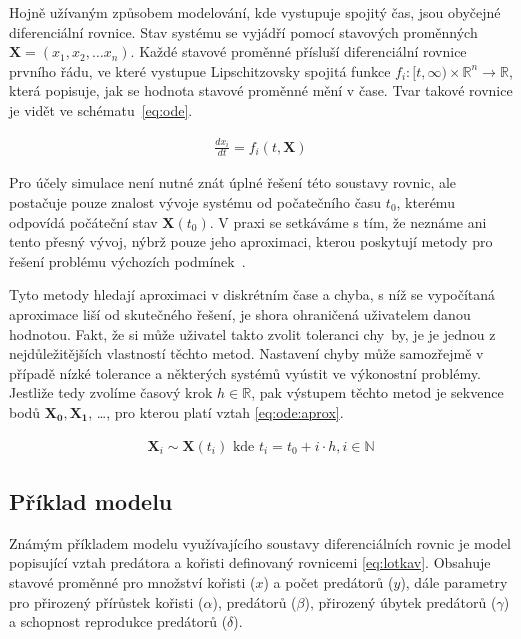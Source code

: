Hojně užívaným způsobem modelování, kde vystupuje spojitý čas, jsou obyčejné diferenciální rovnice.
Stav systému se vyjádří pomocí stavových pro\-měn\-ných $\mathbf{X} = (\mathit{x_1}, \mathit{x_2}, \dots \mathit{x_n})$.
Každé stavové proměnné přísluší diferenciální rovni\-ce prvního řádu, ve které vystupue
Lipschitzovsky spojitá \cite[str. 149 -- 163]{eriksson2004} funkce
$f_i: [t, \infty) \times \mathbb{R}^n \rightarrow \mathbb{R}$, která popisuje,
jak se hodnota stavové proměnné mění v čase. Tvar takové rovnice je vidět ve sché\-ma\-tu~\ref{eq:ode}.

\begin{align}\label{eq:ode}
\frac{d\mathit{x_i}}{dt} = f_i(t, \mathbf{X})
\end{align}

Pro účely simulace není nutné znát úplné řešení této soustavy rovnic, ale postačuje pouze znalost
vývoje systému od počatečního času $t_0$, kterému odpovídá počáteční stav $\mathbf{X}(t_0)$.
V praxi se setkáváme s tím, že neznáme ani tento přesný vývoj, nýbrž pouze jeho aproximaci,
kterou poskytují metody pro řešení problému výchozích podmínek~\cite{iserles1996}.

Tyto metody hledají aproximaci v diskrétním čase a chyba, s níž se vy\-po\-čí\-ta\-ná
aproximace liší od skutečného řešení, je shora ohraničená uživatelem danou hodnotou.
Fakt, že si může uživatel takto zvolit toleranci chy~by, je je jednou z nejdůležitějších
vlastností těchto metod. Nastavení chyby může samozřejmě v případě nízké tolerance
a některých systémů vyústit ve výkonostní problémy. Jestliže tedy zvolíme časový
krok $h \in \mathbb{R}$, pak výstupem těchto metod je sekvence bodů $\mathbf{X_0}, \mathbf{X_1}$, \ldots,
pro kterou platí vztah \ref{eq:ode:aprox}.

\begin{align}\label{eq:ode:aprox}
\mathbf{X}_i \sim \mathbf{X}(t_i) \textrm{ kde } t_i = t_0 + i \cdot h, i \in \mathbb{N}
\end{align}


\subsection{Příklad modelu}\label{section:lotkav}

Známým příkladem modelu využívajícího soustavy diferenciálních rovnic je model popisující vztah predátora
a kořisti \cite{lotka1925} definovaný rovnicemi \ref{eq:lotkav}. Obsahuje stavové pro\-měn\-né
pro množství kořisti ($x$) a počet predátorů ($y$), dále parametry pro přirozený
přírůstek kořisti ($\alpha$),  predátorů ($\beta$), přirozený úbytek
predátorů ($\gamma$) a schopnost reprodukce predátorů ($\delta$).

